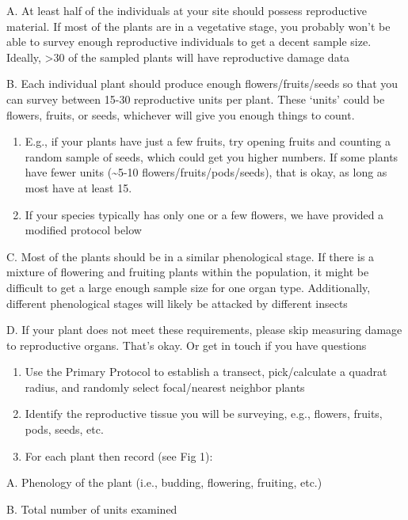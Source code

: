 \documentclass[
  letterpaper,
  oneside,
  open=any]{scrbook}
\begin{document}
A. At least half of the individuals at your site should possess
reproductive material. If most of the plants are in a vegetative stage,
you probably won't be able to survey enough reproductive individuals to
get a decent sample size. Ideally, \textgreater30 of the sampled plants
will have reproductive damage data

B. Each individual plant should produce enough flowers/fruits/seeds so
that you can survey between 15-30 reproductive units per plant. These
`units' could be flowers, fruits, or seeds, whichever will give you
enough things to count.

\begin{enumerate}
\def\labelenumi{\roman{enumi}.}
\item
  E.g., if your plants have just a few fruits, try opening fruits and
  counting a random sample of seeds, which could get you higher numbers.
  If some plants have fewer units (\textasciitilde5-10
  flowers/fruits/pods/seeds), that is okay, as long as most have at
  least 15.
\item
  If your species typically has only one or a few flowers, we have
  provided a modified protocol below
\end{enumerate}

C. Most of the plants should be in a similar phenological stage. If
there is a mixture of flowering and fruiting plants within the
population, it might be difficult to get a large enough sample size for
one organ type. Additionally, different phenological stages will likely
be attacked by different insects

D. If your plant does not meet these requirements, please skip measuring
damage to reproductive organs. That's okay. Or get in touch if you have
questions

\begin{enumerate}
\def\labelenumi{\arabic{enumi}.}
\setcounter{enumi}{1}
\item
  Use the Primary Protocol to establish a transect, pick/calculate a
  quadrat radius, and randomly select focal/nearest neighbor plants
\item
  Identify the reproductive tissue you will be surveying, e.g., flowers,
  fruits, pods, seeds, etc.
\item
  For each plant then record (see Fig 1):
\end{enumerate}

A. Phenology of the plant (i.e., budding, flowering, fruiting, etc.)

B. Total number of units examined
\end{document}
